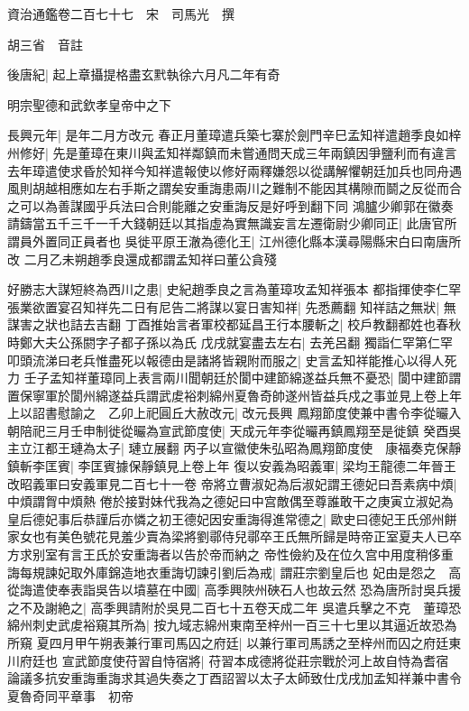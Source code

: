 資治通鑑卷二百七十七　宋　司馬光　撰

胡三省　音註

後唐紀|{
	起上章攝提格盡玄黓執徐六月凡二年有奇}


明宗聖德和武欽孝皇帝中之下

長興元年|{
	是年二月方改元}
春正月董璋遣兵築七寨於劍門辛巳孟知祥遣趙季良如梓州修好|{
	先是董璋在東川與孟知祥鄰鎮而未嘗通問天成三年兩鎮因爭鹽利而有違言去年璋遣使求昏於知祥今知祥遣報使以修好兩釋嫌怨以從講解懼朝廷加兵也同舟遇風則胡越相應如左右手斯之謂矣安重誨患兩川之難制不能因其構隙而鬬之反從而合之可以為善謀國乎兵法曰合則能離之安重誨反是好呼到翻下同}
鴻臚少卿郭在徽奏請鑄當五千三千一千大錢朝廷以其指虛為實無識妄言左遷衛尉少卿同正|{
	此唐官所謂員外置同正員者也}
吳徙平原王澈為德化王|{
	江州德化縣本漢尋陽縣宋白曰南唐所改}
二月乙未朔趙季良還成都謂孟知祥曰董公貪殘

好勝志大謀短終為西川之患|{
	史紀趙季良之言為董璋攻孟知祥張本}
都指揮使李仁罕張業欲置宴召知祥先二日有尼告二將謀以宴日害知祥|{
	先悉薦翻}
知祥詰之無狀|{
	無謀害之狀也詰去吉翻}
丁酉推始言者軍校都延昌王行本腰斬之|{
	校戶教翻都姓也春秋時鄭大夫公孫閼字子都子孫以為氏}
戊戌就宴盡去左右|{
	去羌呂翻}
獨詣仁罕第仁罕叩頭流涕曰老兵惟盡死以報德由是諸將皆親附而服之|{
	史言孟知祥能推心以得人死力}
壬子孟知祥董璋同上表言兩川聞朝廷於閬中建節綿遂益兵無不憂恐|{
	閬中建節謂置保寧軍於閬州綿遂益兵謂武䖍裕刺綿州夏魯奇帥遂州皆益兵戍之事並見上卷上年}
上以詔書慰諭之　乙卯上祀圓丘大赦改元|{
	改元長興}
鳳翔節度使兼中書令李從曮入朝陪祀三月壬申制徙從曮為宣武節度使|{
	天成元年李從曮再鎮鳳翔至是徙鎮}
癸酉吳主立江都王璉為太子|{
	璉立展翻}
丙子以宣徽使朱弘昭為鳳翔節度使　康福奏克保靜鎮斬李匡賓|{
	李匡賓據保靜鎮見上卷上年}
復以安義為昭義軍|{
	梁均王龍德二年晉王改昭義軍曰安義軍見二百七十一卷}
帝將立曹淑妃為后淑妃謂王德妃曰吾素病中煩|{
	中煩謂胷中煩熱}
倦於接對妹代我為之德妃曰中宫敵偶至尊誰敢干之庚寅立淑妃為皇后德妃事后恭謹后亦憐之初王德妃因安重誨得進常德之|{
	歐史曰德妃王氏邠州餅家女也有美色號花見羞少賣為梁將劉鄩侍兒鄩卒王氏無所歸是時帝正室夏夫人已卒方求别室有言王氏於安重誨者以告於帝而納之}
帝性儉約及在位久宫中用度稍侈重誨每規諫妃取外庫錦造地衣重誨切諫引劉后為戒|{
	謂莊宗劉皇后也}
妃由是怨之　高從誨遣使奉表詣吳告以墳墓在中國|{
	高季興陜州硤石人也故云然}
恐為唐所討吳兵援之不及謝絶之|{
	高季興請附於吳見二百七十五卷天成二年}
吳遣兵擊之不克　董璋恐綿州刺史武䖍裕窺其所為|{
	按九域志綿州東南至梓州一百三十七里以其逼近故恐為所窺}
夏四月甲午朔表兼行軍司馬囚之府廷|{
	以兼行軍司馬誘之至梓州而囚之府廷東川府廷也}
宣武節度使苻習自恃宿將|{
	苻習本成德將從莊宗戰於河上故自恃為耆宿}
論議多抗安重誨重誨求其過失奏之丁酉詔習以太子太師致仕戊戌加孟知祥兼中書令夏魯奇同平章事　初帝

